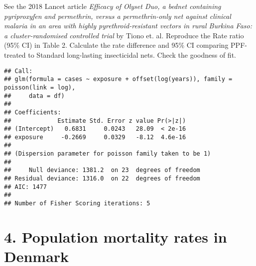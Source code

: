 \documentclass[10pt,handout]{beamer}\usepackage[]{graphicx}\usepackage[]{color}
\makeatletter
\newenvironment{kframe}{%
 \def\at@end@of@kframe{}%
 \ifinner\ifhmode%
  \def\at@end@of@kframe{\end{minipage}}%
  \begin{minipage}{\columnwidth}%
 \fi\fi%
 \def\FrameCommand##1{\hskip\@totalleftmargin \hskip-\fboxsep
 \colorbox{shadecolor}{##1}\hskip-\fboxsep
     \hskip-\linewidth \hskip-\@totalleftmargin \hskip\columnwidth}%
 \MakeFramed {\advance\hsize-\width
   \@totalleftmargin\z@ \linewidth\hsize
   \@setminipage}}%
 {\par\unskip\endMakeFramed%
 \at@end@of@kframe}
\newenvironment{knitrout}{}{} %
\makeatother
\begin{document}
\begin{frame}
		\vspace*{-1.091in}
\tiny
See the 2018 Lancet article \textit{Efficacy of Olyset Duo, a bednet containing pyriproxyfen and permethrin, versus a permethrin-only net against clinical malaria in an area with highly pyrethroid-resistant vectors in rural Burkina Faso: a cluster-randomised controlled trial} by Tiono et. al. Reproduce the Rate ratio (95\% CI) in Table 2. Calculate the rate difference and 95\% CI comparing PPF-treated to Standard long-lasting insecticidal nets. Check the goodness of fit. 




\begin{knitrout}\tiny
{}\color{fgcolor}\begin{kframe}
\begin{verbatim}
## Call:
## glm(formula = cases ~ exposure + offset(log(years)), family = poisson(link = log), 
##     data = df)
## 
## Coefficients:
##             Estimate Std. Error z value Pr(>|z|)
## (Intercept)   0.6831     0.0243   28.09  < 2e-16
## exposure     -0.2669     0.0329   -8.12  4.6e-16
## 
## (Dispersion parameter for poisson family taken to be 1)
## 
##     Null deviance: 1381.2  on 23  degrees of freedom
## Residual deviance: 1316.0  on 22  degrees of freedom
## AIC: 1477
## 
## Number of Fisher Scoring iterations: 5
\end{verbatim}
\end{kframe}
\end{knitrout}

\end{frame}


\section{4. Population mortality rates in Denmark}
\end{document}
